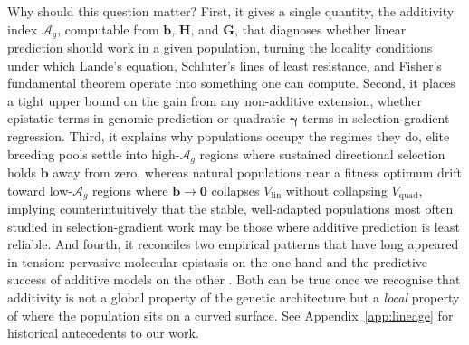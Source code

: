 \documentclass[9pt,twocolumn,twoside,lineno]{gsajnl}
\newcommand{\vect}[1]{\boldsymbol{#1}}
\newcommand{\mat}[1]{\mathbf{#1}}
\newcommand{\Ag}{\ensuremath{\mathcal{A}_{g}}\xspace}
\newcommand{\Vlin}{\ensuremath{V_{\text{lin}}}\xspace}
\newcommand{\Vquad}{\ensuremath{V_{\text{quad}}}\xspace}
\begin{document}
Why should this question matter? First, it gives a single quantity, the additivity index \Ag, computable from $\vect{b}$, $\mat{H}$, and $\mat{G}$, that diagnoses whether linear prediction should work in a given population, turning the locality conditions under which Lande's equation, Schluter's lines of least resistance, and Fisher's fundamental theorem operate into something one can compute. Second, it places a tight upper bound on the gain from any non-additive extension, whether epistatic terms in genomic prediction or quadratic $\bm{\gamma}$ terms in selection-gradient regression. Third, it explains why populations occupy the regimes they do, elite breeding pools settle into high-\Ag regions where sustained directional selection holds $\vect{b}$ away from zero, whereas natural populations near a fitness optimum drift toward low-\Ag regions where $\vect{b} \to \vect{0}$ collapses $\Vlin$ without collapsing $\Vquad$, implying counterintuitively that the stable, well-adapted populations most often studied in selection-gradient work may be those where additive prediction is least reliable. And fourth, it reconciles two empirical patterns that have long appeared in tension: pervasive molecular epistasis on the one hand \citep{Phillips2008, HuangMackay2016} and the predictive success of additive models on the other \citep{HillGoddardVisscher2008, Meuwissen2001}. Both can be true once we recognise that additivity is not a global property of the genetic architecture but a \emph{local} property of where the population sits on a curved surface. See Appendix~\ref{app:lineage} for historical antecedents to our work.
\end{document}

